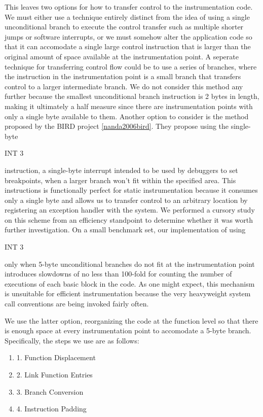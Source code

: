 This leaves two options for how to transfer control to the instrumentation code. We must either use 
a technique entirely distinct from the idea of using a single unconditional branch to execute the control
transfer such as multiple shorter jumps or software interrupts, or we must somehow alter the
application code so that it can accomodate a single large control instruction that is larger than the original
amount of space available at the instrumentation point. A seperate technique for transferring control flow
could be to use a series of branches, where the instruction in the instrumentation point is a small branch that
transfers control to a larger intermediate branch. We do not consider this method any further because the smallest
unconditional branch instruction is 2 bytes in length, making it ultimately a half measure since there are instrumentation
points with only a single byte available to them. Another option to consider is the method proposed by the BIRD project 
\ref{nanda2006bird}. They propose using the single-byte \begin{it}INT 3\end{it}
instruction, a single-byte interrupt intended to be used by debuggers to set breakpoints, when a larger branch won't fit within 
the specified area. This instructions is functionally perfect for static instrumentation because it consumes only a single
byte and allows us to transfer control to an arbitrary location by registering an exception handler
with the system. We performed a cursory study on this scheme from an efficiency standpoint to determine whether it was worth
further investigation. On a small benchmark set, our
implementation of using \begin{it}INT 3\end{it} only when 5-byte unconditional branches do
not fit at the instrumentation point introduces slowdowns of no less than 100-fold for counting the
number of executions of each basic block in the code. As one might expect, this mechanism is unsuitable
for efficient instrumentation because the very heavyweight system call conventions are being invoked
fairly often.

We use the latter option, reorganizing the code at the function level so that there is enough space at every instrumentation
point to accomodate a 5-byte branch. Specifically, the steps we use are as follows:
\begin{enumerate}
\item 
1. Function Displacement
\item
2. Link Function Entries 
\item
3. Branch Conversion
\item
4. Instruction Padding
\end{enumerate}



